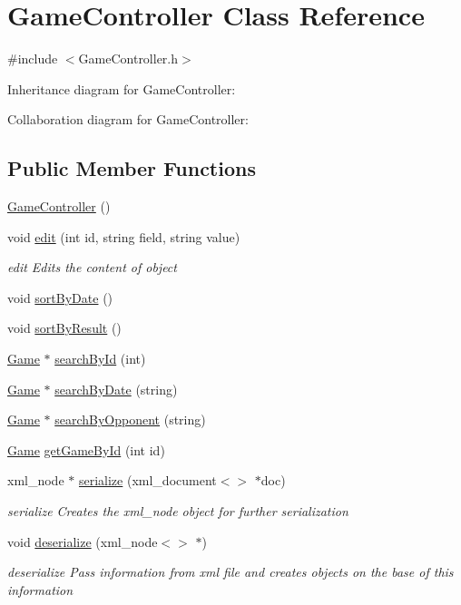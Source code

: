 \hypertarget{class_game_controller}{\section{Game\-Controller Class Reference}
\label{class_game_controller}
}


{\ttfamily \#include $<$Game\-Controller.\-h$>$}



Inheritance diagram for Game\-Controller\-:


Collaboration diagram for Game\-Controller\-:
\subsection*{Public Member Functions}
\begin{DoxyCompactItemize}
\item 
\hyperlink{class_game_controller_a7d72ff3f639acb68578e20fee3649b42}{Game\-Controller} ()
\item 
void \hyperlink{class_game_controller_a6bb98af3aa77930625e8bd207c79af06}{edit} (int id, string field, string value)
\begin{DoxyCompactList}\small\item\em edit Edits the content of object \end{DoxyCompactList}\item 
void \hyperlink{class_game_controller_a47969d486d0f3e1a3a46db09653be507}{sort\-By\-Date} ()
\item 
void \hyperlink{class_game_controller_a6db50feecfb3f8244fd549027f52b6a1}{sort\-By\-Result} ()
\item 
\hyperlink{class_game}{Game} $\ast$ \hyperlink{class_game_controller_a285063010bded38aa3e2b4d7be9d914a}{search\-By\-Id} (int)
\item 
\hyperlink{class_game}{Game} $\ast$ \hyperlink{class_game_controller_a271685999fb6548823b147eedda38345}{search\-By\-Date} (string)
\item 
\hyperlink{class_game}{Game} $\ast$ \hyperlink{class_game_controller_ab6d352fa9f3a4ba5b9e72698e7919441}{search\-By\-Opponent} (string)
\item 
\hyperlink{class_game}{Game} \hyperlink{class_game_controller_af7cf01ef8ae8c809a72400ee250f0e2f}{get\-Game\-By\-Id} (int id)
\item 
xml\-\_\-node $\ast$ \hyperlink{class_game_controller_a839d19d81fc46c4fcb3b8c6eb5fd6cda}{serialize} (xml\-\_\-document$<$$>$ $\ast$doc)
\begin{DoxyCompactList}\small\item\em serialize Creates the xml\-\_\-node object for further serialization \end{DoxyCompactList}\item 
void \hyperlink{class_game_controller_a5182b219041e94233912a3395c6c039d}{deserialize} (xml\-\_\-node$<$$>$ $\ast$)
\begin{DoxyCompactList}\small\item\em deserialize Pass information from xml file and creates objects on the base of this information \end{DoxyCompactList}\end{DoxyCompactItemize}
